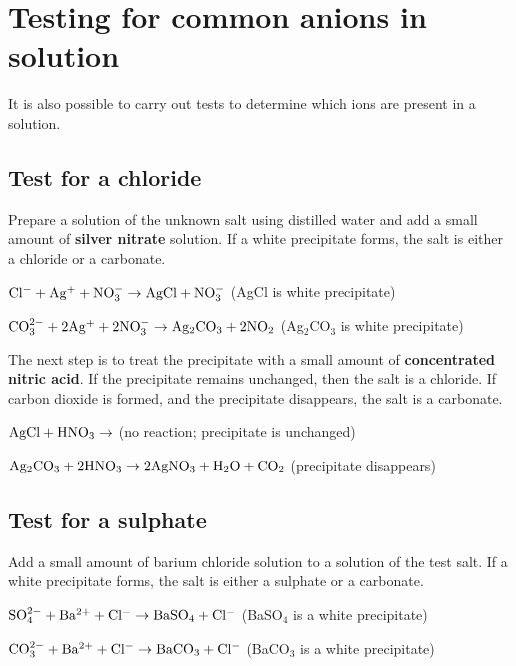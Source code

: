 



\section{Testing for common anions in solution}

It is also possible to carry out tests to determine which ions are present in a solution.

\subsection{Test for a chloride}

Prepare a solution of the unknown salt using distilled water and add a small amount of \textbf{silver nitrate} solution. If a white precipitate forms, the salt is either a chloride or a carbonate.

\begin{center}
$\rm{Cl^{-} + Ag^{+} + NO_{3}^{-} \rightarrow AgCl + NO_{3}^{-}}$ (AgCl is white precipitate)

$\rm{CO_{3}^{2-} + 2Ag^{+} + 2NO_{3}^{-} \rightarrow Ag_{2}CO_{3} + 2NO_{2}}$ (Ag$_{2}$CO$_{3}$ is white precipitate)
\end{center} 

The next step is to treat the precipitate with a small amount of \textbf{concentrated nitric acid}. If the precipitate remains unchanged, then the salt is a chloride. If carbon dioxide is formed, and the precipitate disappears, the salt is a carbonate.

\begin{center} 
$\rm{AgCl + HNO_{3} \rightarrow}$ (no reaction; precipitate is unchanged)

$\rm{Ag_{2}CO_{3} + 2HNO_{3} \rightarrow 2AgNO_{3} + H_{2}O + CO_{2}}$ (precipitate disappears)
\end{center}

\subsection{Test for a sulphate}

Add a small amount of barium chloride solution to a solution of the test salt. If a white precipitate forms, the salt is either a sulphate or a carbonate.

\begin{center}
$\rm{SO_{4}^{2-} + Ba^{2+} + Cl^{-} \rightarrow BaSO_{4} + Cl^{-}}$ (BaSO$_{4}$ is a white precipitate)

$\rm{CO_{3}^{2-} + Ba^{2+} + Cl^{-} \rightarrow BaCO_{3} + Cl^{-}}$ (BaCO$_{3}$ is a white precipitate)
\end{center}

